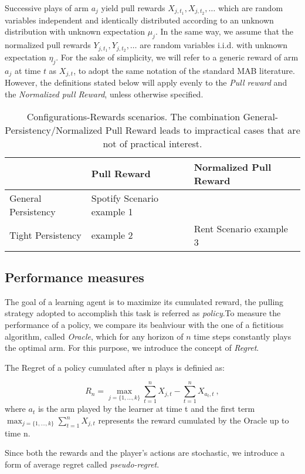 Successive plays of arm $a_j$ yield pull rewards $X_{j,t_1}, X_{j,t_2},\dots$ which are random variables independent and identically distributed according to an unknown distribution with unknown expectation $\mu_j$.
In the same way, we assume that the normalized pull rewards $Y_{j,t_1}, Y_{j,t_2}, \dots$ are random variables i.i.d. with unknown expectation $\eta_j$. For the sake of simplicity, we will refer to a generic reward of arm $a_j$ at time $t$ as  $X_{j,t}$, to adopt the same notation of the standard MAB literature. However, the definitions stated below will apply evenly to the \emph{Pull reward} and the \emph{Normalized pull Reward}, unless otherwise specified.\\

\begin{table}

\begin{center}
	\caption{Configurations-Rewards scenarios. The combination General-Persistency/Normalized Pull Reward leads to impractical cases that are not of practical interest.}\label{tabNF}
	\begin{tabularx}{0.8\textwidth} { 
			| >{\raggedright\arraybackslash}X 
			| >{\centering\arraybackslash}X 
			| >{\centering\arraybackslash}X | }
		\hline
		  & Pull Reward & Normalized Pull Reward \\
		\hline
		General Persistency  &  Spotify Scenario example 1 &   \\
		\hline
		Tight Persistency  & example 2  & 
			    Rent Scenario example 3
			 \\
		\hline		
	\end{tabularx}	
\end{center}

\end{table}




\subsection{ Performance measures}
The goal of a learning agent is to maximize its cumulated reward, the pulling strategy adopted to accomplish this task is referred as \emph{policy}.To measure the performance of a policy, we compare its beahviour with the one of a fictitious algorithm, called \emph{Oracle}, which for any horizon of $n$ time steps constantly plays the optimal arm. For this purpose, we introduce the concept of \emph{Regret}.
\begin{definition}[Regret]
	The Regret of a policy cumulated after n plays is definied as:
	
		$$R_n=\max_{j = \{1,\dots,k\}} \sum_{t=1}^n{X_{j,t}} - \sum_{t=1}^{n} X_{a_t,t}  \ ,$$
where  $a_t$ is the arm played by the learner at time t and the first term \ $\max_{j = \{1,\dots,k\}}\sum_{t=1}^n{X_{j,t}}$ represents the reward cumulated by the Oracle up to time n.

\end{definition}
Since both the rewards and the player's actions are stochastic, we introduce a form of average regret called \emph{pseudo-regret}.

